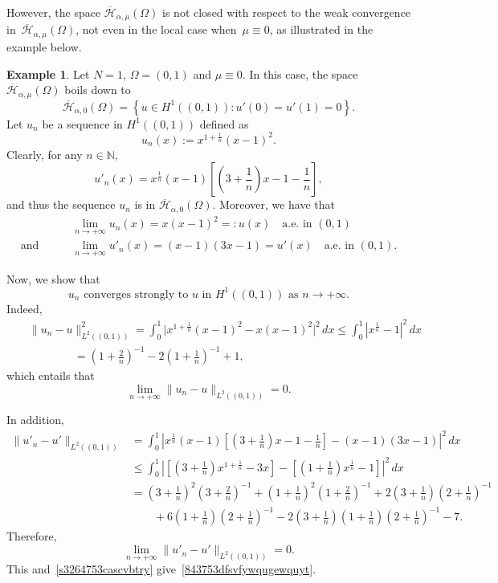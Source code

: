 \documentclass[12pt,a4paper,intlimits,sumlimits]{amsart}
\def \N {\mathbb{N}}
\theoremstyle{definition}
\newtheorem{example}[definition]{Example}
\theoremstyle{plain}
\numberwithin{equation}{section}
\renewcommand{\leq}{\leqslant}
\begin{document}
\begin{appendix}
However, the space $\overline{\mathcal H}_{\alpha, \mu}(\Omega)$ is not closed with respect to the weak convergence in~$\overline{\mathcal H}_{\alpha, \mu}(\Omega)$, not even in the local case when~$\mu\equiv 0$, as illustrated in the example below.

\begin{example}
Let $N=1$, $\Omega=(0,1)$ and $\mu\equiv 0$. In this case, the space
$\overline{\mathcal H}_{\alpha, \mu}(\Omega)$ boils down to
\[
\overline{\mathcal H}_{\alpha, 0}(\Omega)
=\left\{u\in H^1((0,1)):u'(0)=u'(1)=0 \right\}.
\]
Let $u_n$ be a sequence in $H^1((0,1))$ defined as
\[
u_n(x):=x^{1+\frac{1}{n}}(x-1)^2.
\]
Clearly, for any $n\in \N$,
\[
u'_n(x)=x^\frac{1}{n}(x-1)\left[\left(3+\frac{1}{n}\right)x -1-	\frac{1}{n}\right],
\]
and thus the sequence $u_n$ is in $\overline{\mathcal H}_{\alpha, 0}(\Omega)$. Moreover, we have that
\begin{eqnarray*}
&&\lim_{n\to+\infty}u_n(x) = x(x-1)^2=:u(x) \quad \mbox{a.e. in }(0,1) \\
{\mbox{and }}\quad && \lim_{n\to+\infty}
u'_n(x) = (x-1)(3x-1)=u'(x) \quad \mbox{a.e. in }(0,1).
\end{eqnarray*}

Now, we show that
\begin{equation}\label{843753dfsvfywqugewquyt}
{\mbox{$u_n$ converges strongly to $u$ in $H^1((0,1))$ as~$n\to+\infty$.}}\end{equation}
Indeed, 
\begin{eqnarray*}&&
\|u_n-u\|_{L^2((0,1))}^2=
\int_0^1\big|x^{1+\frac{1}{n}}(x-1)^2-x(x-1)^2\big|^2\,dx
\leq \int_0^1|x^{\frac{1}{n}}-1|^2\,dx \\
&&\qquad\qquad =\left(1+\frac{2}{n}\right)^{-1}-2\left(1+\frac{1}{n}\right)^{-1}
+1,
\end{eqnarray*}
which entails that
\begin{equation}\label{s3264753cascvbtry}
\lim_{n\to +\infty}\|u_n-u\|_{L^2((0,1))}=0.
\end{equation}

In addition,
\[
\begin{aligned}
\|u'_n-u'\|_{L^2((0,1))}&=
\int_0^1\left|x^\frac{1}{n}(x-1)\left[\left(3+\frac{1}{n}\right)x -1-	\frac{1}{n}\right]-(x-1)(3x-1)\right|^2\,dx \\
&\leq \int_0^1\left|\left[\left(3+\frac{1}{n}\right)x^{1+\frac{1}{n}} -3x\right]-\left[\left(1+\frac{1}{n}\right)x^{\frac{1}{n}}-1 \right]\right|^2\,dx \\
&=\left(3+\frac{1}{n}\right)^2\left(3+\frac{2}{n}\right)^{-1}
+\left(1+\frac{1}{n}\right)^2\left(1+\frac{2}{n}\right)^{-1}
+2\left(3+\frac{1}{n}\right)\left(2+\frac{1}{n}\right)^{-1} \\
&\qquad 
+6\left(1+\frac{1}{n}\right)\left(2+\frac{1}{n}\right)^{-1}
-2\left(3+\frac{1}{n}\right)\left(1+\frac{1}{n}\right)
\left(2+\frac{1}{n}\right)^{-1}-7.
\end{aligned}
\]
Therefore,
\[
\lim_{n\to +\infty}\|u'_n-u'\|_{L^2((0,1))}=0.
\]
This and~\eqref{s3264753cascvbtry} give~\eqref{843753dfsvfywqugewquyt}.


\end{example}
\end{appendix}
\end{document}
